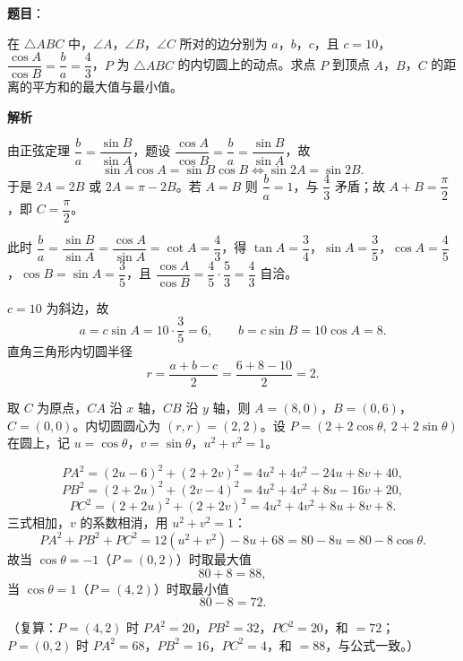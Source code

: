 \begin{answer}

\textbf{题目}：

在 $\triangle ABC$ 中，$\angle A$，$\angle B$，$\angle C$ 所对的边分别为 $a$，$b$，$c$，且 $c=10$，$\dfrac{\cos A}{\cos B}=\dfrac ba=\dfrac43$，$P$ 为 $\triangle ABC$ 的内切圆上的动点。求点 $P$ 到顶点 $A$，$B$，$C$ 的距离的平方和的最大值与最小值。

\textbf{解析}

由正弦定理 $\dfrac ba=\dfrac{\sin B}{\sin A}$，题设 $\dfrac{\cos A}{\cos B}=\dfrac ba=\dfrac{\sin B}{\sin A}$，故
\nopagebreak[4]
\[
\sin A\cos A=\sin B\cos B\iff \sin2A=\sin2B.
\]
于是 $2A=2B$ 或 $2A=\pi-2B$。若 $A=B$ 则 $\dfrac ba=1$，与 $\dfrac43$ 矛盾；故 $A+B=\dfrac\pi2$，即 $C=\dfrac\pi2$。

此时 $\dfrac ba=\dfrac{\sin B}{\sin A}=\dfrac{\cos A}{\sin A}=\cot A=\dfrac43$，得 $\tan A=\dfrac34$，$\sin A=\dfrac35$，$\cos A=\dfrac45$，$\cos B=\sin A=\dfrac35$，且 $\dfrac{\cos A}{\cos B}=\dfrac45\cdot\dfrac53=\dfrac43$ 自洽。

$c=10$ 为斜边，故
\nopagebreak[4]
\[
a=c\sin A=10\cdot\frac35=6,\qquad b=c\sin B=10\cos A=8.
\]
直角三角形内切圆半径
\nopagebreak[4]
\[
r=\frac{a+b-c}2=\frac{6+8-10}2=2.
\]

取 $C$ 为原点，$CA$ 沿 $x$ 轴，$CB$ 沿 $y$ 轴，则 $A=(8,0)$，$B=(0,6)$，$C=(0,0)$。内切圆圆心为 $(r,r)=(2,2)$。设 $P=(2+2\cos\theta,\ 2+2\sin\theta)$ 在圆上，记 $u=\cos\theta$，$v=\sin\theta$，$u^2+v^2=1$。

\nopagebreak[4]
\[
PA^2=(2u-6)^2+(2+2v)^2=4u^2+4v^2-24u+8v+40,
\]
\nopagebreak[4]
\[
PB^2=(2+2u)^2+(2v-4)^2=4u^2+4v^2+8u-16v+20,
\]
\nopagebreak[4]
\[
PC^2=(2+2u)^2+(2+2v)^2=4u^2+4v^2+8u+8v+8.
\]
三式相加，$v$ 的系数相消，用 $u^2+v^2=1$：
\nopagebreak[4]
\[
PA^2+PB^2+PC^2=12(u^2+v^2)-8u+68=80-8u=80-8\cos\theta.
\]
故当 $\cos\theta=-1$（$P=(0,2)$）时取最大值
\nopagebreak[4]
\[
80+8=88,
\]
当 $\cos\theta=1$（$P=(4,2)$）时取最小值
\nopagebreak[4]
\[
80-8=72.
\]

（复算：$P=(4,2)$ 时 $PA^2=20$，$PB^2=32$，$PC^2=20$，和 $=72$；$P=(0,2)$ 时 $PA^2=68$，$PB^2=16$，$PC^2=4$，和 $=88$，与公式一致。）


\end{answer}
